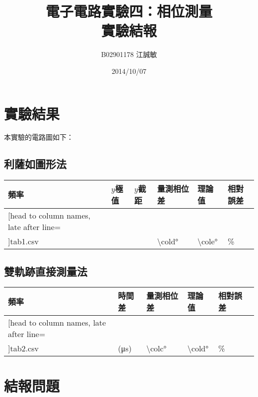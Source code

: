 \documentclass[12pt, a4paper]{article}
\title{ \bf {\Huge 電子電路實驗四：相位測量}\\ 實驗結報}
\author{B02901178 江誠敏}
\date{2014/10/07}
\begin{document}
\maketitle

\section{實驗結果}
本實驗的電路圖如下：\\
\begin{center}
\end{center}


\subsection{利薩如圖形法}
\begin{center}
	\begin{tabular}{p{2cm}p{2cm}p{2cm}p{2.5cm}p{2.5cm}p{2cm}}
	\hline
	頻率 & $y$極值 & $y$截距 & 量測相位差 & 理論值 & 相對誤差 \\
	\hline
	\hline
	\csvreader[head to column names, late after line=\\\hline]{tab1.csv}{}%
	{\cola&\colb&\colc&\ang{\cold}&\ang{\cole}&\colf\%}
\end{tabular}
\end{center}


\subsection{雙軌跡直接測量法}

\begin{center}
	\begin{tabular}{p{2cm}p{2cm}p{2cm}p{2.5cm}p{2.5cm}p{2cm}}
	\hline
	頻率 & 時間差 & 量測相位差 & 理論值 & 相對誤差 \\
	\hline
	\hline
	\csvreader[head to column names, late after line=\\\hline]{tab2.csv}{}%
	{\cola&\colb\:(\si{\micro\second})&\ang{\colc}&\ang{\cold}&\cole\%}
\end{tabular}
\end{center}


\section{結報問題}
\end{document}
